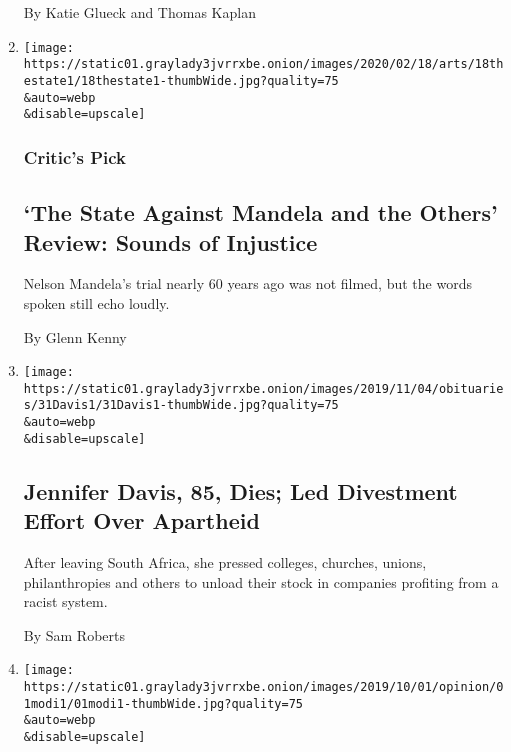 \begin{enumerate}
  By Katie Glueck and Thomas Kaplan
\item
  \href{/2020/02/18/movies/the-state-against-mandela-and-the-others-review.html}{}

  \texttt{[image: https://static01.graylady3jvrrxbe.onion/images/2020/02/18/arts/18thestate1/18thestate1-thumbWide.jpg?quality=75\\\&auto=webp\\\&disable=upscale]}

  \hypertarget{critics-pick}{%
  \subsubsection{Critic's Pick}\label{critics-pick}}

  \hypertarget{the-state-against-mandela-and-the-others-review-sounds-of-injustice}{%
  \subsection{`The State Against Mandela and the Others' Review: Sounds
  of
  Injustice}\label{the-state-against-mandela-and-the-others-review-sounds-of-injustice}}

  Nelson Mandela's trial nearly 60 years ago was not filmed, but the
  words spoken still echo loudly.

  By Glenn Kenny
\item
  \href{/2019/10/31/world/africa/jennifer-davis-dead.html}{}

  \texttt{[image: https://static01.graylady3jvrrxbe.onion/images/2019/11/04/obituaries/31Davis1/31Davis1-thumbWide.jpg?quality=75\\\&auto=webp\\\&disable=upscale]}

  \hypertarget{jennifer-davis-85-dies-led-divestment-effort-over-apartheid}{%
  \subsection{Jennifer Davis, 85, Dies; Led Divestment Effort Over
  Apartheid}\label{jennifer-davis-85-dies-led-divestment-effort-over-apartheid}}

  After leaving South Africa, she pressed colleges, churches, unions,
  philanthropies and others to unload their stock in companies profiting
  from a racist system.

  By Sam Roberts
\item
  \href{/2019/10/02/opinion/modi-mahatma-gandhi.html}{}

  \texttt{[image: https://static01.graylady3jvrrxbe.onion/images/2019/10/01/opinion/01modi1/01modi1-thumbWide.jpg?quality=75\\\&auto=webp\\\&disable=upscale]}


\end{enumerate}

